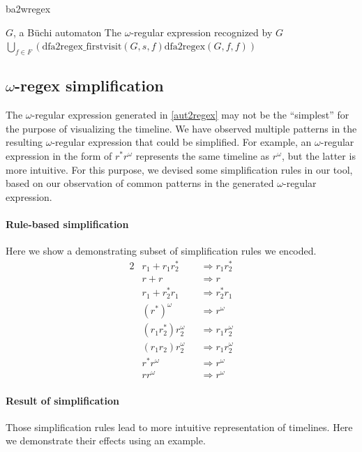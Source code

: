 \documentclass[preprint,12pt]{elsarticle}
\theoremstyle{definition}
\theoremstyle{remark}
\newcommand{\Buchi}{B\"{u}chi }
\begin{document}
\begin{algorithm}[h!]
    \label{alg:ba2wregex}
    \caption{ba2wregex}
    \begin{algorithmic}
        \Require $G$, a \Buchi automaton
        \Ensure The $\omega$-regular expression recognized by $G$
        \State \Return $\bigcup_{f \in F}\left(\text{dfa2regex\_firstvisit}(G, s, f)\text{\^{}dfa2regex}(G, f, f) \right) $
    \end{algorithmic}
\end{algorithm}

\subsection{$\omega$-regex simplification} \label{regex-simplify}

The $\omega$-regular expression generated in \cref{aut2regex} may not be the ``simplest'' for the purpose of visualizing the timeline. We have observed multiple patterns in the resulting $\omega$-regular expression that could be simplified. For example, an $\omega$-regular expression in the form of $r^*r^{\omega}$ represents the same timeline as $r^{\omega}$, but the latter is more intuitive. For this purpose, we devised some simplification rules in our tool, based on our observation of common patterns in the generated $\omega$-regular expression.

\paragraph*{Rule-based simplification}
Here we show a demonstrating subset of simplification rules we encoded.
\begin{alignat*}{2}
        & r_1 + r_1r_2^* && \Longrightarrow r_1r_2^* \\
        & r + r && \Longrightarrow r \\
        & r_1 + r_2^*r_1 && \Longrightarrow r_2^*r_1 \\
        & (r^*)^{\omega} && \Longrightarrow r^{\omega} \\
        & (r_1r_2^*)r_2^{\omega} && \Longrightarrow r_1r_2^{\omega} \\
        & (r_1r_2)r_2^{\omega} && \Longrightarrow r_1r_2^{\omega} \\
        & r^*r^{\omega} && \Longrightarrow r^{\omega} \\
        & rr^{\omega} && \Longrightarrow r^{\omega}
\end{alignat*}

\paragraph*{Result of simplification}
Those simplification rules lead to more intuitive representation of timelines. Here we demonstrate their effects using an example.
\end{document}
